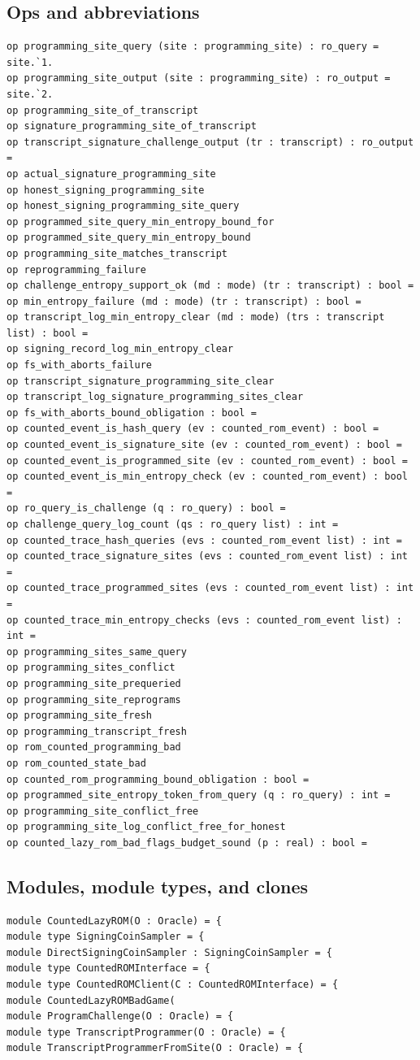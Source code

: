 \subsection*{Ops and abbreviations}
\begin{lstlisting}[language=EasyCrypt,basicstyle=\ttfamily\tiny]
op programming_site_query (site : programming_site) : ro_query = site.`1.
op programming_site_output (site : programming_site) : ro_output = site.`2.
op programming_site_of_transcript
op signature_programming_site_of_transcript
op transcript_signature_challenge_output (tr : transcript) : ro_output =
op actual_signature_programming_site
op honest_signing_programming_site
op honest_signing_programming_site_query
op programmed_site_query_min_entropy_bound_for
op programmed_site_query_min_entropy_bound
op programming_site_matches_transcript
op reprogramming_failure
op challenge_entropy_support_ok (md : mode) (tr : transcript) : bool =
op min_entropy_failure (md : mode) (tr : transcript) : bool =
op transcript_log_min_entropy_clear (md : mode) (trs : transcript list) : bool =
op signing_record_log_min_entropy_clear
op fs_with_aborts_failure
op transcript_signature_programming_site_clear
op transcript_log_signature_programming_sites_clear
op fs_with_aborts_bound_obligation : bool =
op counted_event_is_hash_query (ev : counted_rom_event) : bool =
op counted_event_is_signature_site (ev : counted_rom_event) : bool =
op counted_event_is_programmed_site (ev : counted_rom_event) : bool =
op counted_event_is_min_entropy_check (ev : counted_rom_event) : bool =
op ro_query_is_challenge (q : ro_query) : bool =
op challenge_query_log_count (qs : ro_query list) : int =
op counted_trace_hash_queries (evs : counted_rom_event list) : int =
op counted_trace_signature_sites (evs : counted_rom_event list) : int =
op counted_trace_programmed_sites (evs : counted_rom_event list) : int =
op counted_trace_min_entropy_checks (evs : counted_rom_event list) : int =
op programming_sites_same_query
op programming_sites_conflict
op programming_site_prequeried
op programming_site_reprograms
op programming_site_fresh
op programming_transcript_fresh
op rom_counted_programming_bad
op rom_counted_state_bad
op counted_rom_programming_bound_obligation : bool =
op programmed_site_entropy_token_from_query (q : ro_query) : int =
op programming_site_conflict_free
op programming_site_log_conflict_free_for_honest
op counted_lazy_rom_bad_flags_budget_sound (p : real) : bool =
\end{lstlisting}

\subsection*{Modules, module types, and clones}
\begin{lstlisting}[language=EasyCrypt,basicstyle=\ttfamily\tiny]
module CountedLazyROM(O : Oracle) = {
module type SigningCoinSampler = {
module DirectSigningCoinSampler : SigningCoinSampler = {
module type CountedROMInterface = {
module type CountedROMClient(C : CountedROMInterface) = {
module CountedLazyROMBadGame(
module ProgramChallenge(O : Oracle) = {
module type TranscriptProgrammer(O : Oracle) = {
module TranscriptProgrammerFromSite(O : Oracle) = {
\end{lstlisting}

